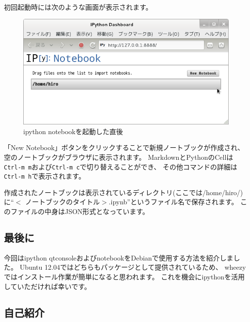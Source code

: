 \documentclass[mingoth,a4paper]{jsarticle}
\begin{document}

初回起動時には次のような画面が表示されます。

\begin{figure}[ht]
  \begin{center}
    \includegraphics[width=0.67\hsize]{image2012-gum/ipython-notebook.png}
  \end{center}
  \caption{ipython notebookを起動した直後}
  \label{fig:ipython-notebook}
\end{figure}

「New Notebook」ボタンをクリックすることで新規ノートブックが作成され、
空のノートブックがブラウザに表示されます。
MarkdownとPythonのCellは\texttt{Ctrl-m m}および\texttt{Ctrl-m c}で切り替えることができ、
その他コマンドの詳細は\texttt{Ctrl-m h}で表示されます。

作成されたノートブックは表示されているディレクトリ(ここでは/home/hiro/)に``$<$ ノートブックのタイトル$>$.ipynb''というファイル名で保存されます。
このファイルの中身はJSON形式となっています。

\subsection{最後に}

今回はipython qtconsoleおよびnotebookをDebianで使用する方法を紹介しました。
Ubuntu 12.04ではどちらもパッケージとして提供されているため、
wheezyではインストール作業が簡単になると思われます。
これを機会にipythonを活用していただければ幸いです。


\label{sec:libreoffice}

\subsection{自己紹介}
\end{document}
